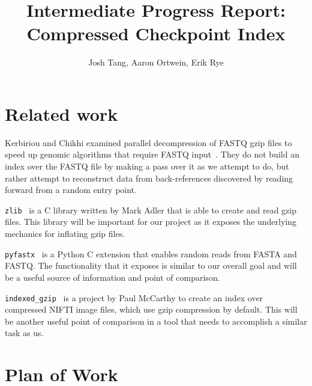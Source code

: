 \documentclass[10pt]{article}
\title{Intermediate Progress Report:\\ Compressed Checkpoint Index}
\author{Josh Tang, Aaron Ortwein, Erik Rye}
\begin{document}
\maketitle
\section{Related work}

Kerbiriou and Chikhi examined parallel decompression of FASTQ gzip files to
speed up genomic algorithms that require FASTQ
input~\cite{kerbiriou2019parallel}. They do not build an index over the FASTQ
file by making a pass over it as we attempt to do, but rather attempt to
reconstruct data from back-references discovered by reading forward from a
random entry point.

\texttt{zlib}~\cite{roelofs2005zlib} is a C library written by Mark Adler that
is able to create and read gzip files. This library will be important for our
project as it exposes the underlying mechanics for inflating gzip files.

\texttt{pyfastx}~\cite{pyfastx} is a Python C extension that enables random
reads from FASTA and FASTQ. The functionality that it exposes is similar to our
overall goal and will be a useful source of information and point of comparison.

\texttt{indexed\_gzip}~\cite{indexedgzip} is a project by Paul McCarthy to
create an index over compressed NIFTI image files, which use gzip compression by
default. This will be another useful point of comparison in a tool that needs to
accomplish a similar task as us.



\section{Plan of Work}
\end{document}

